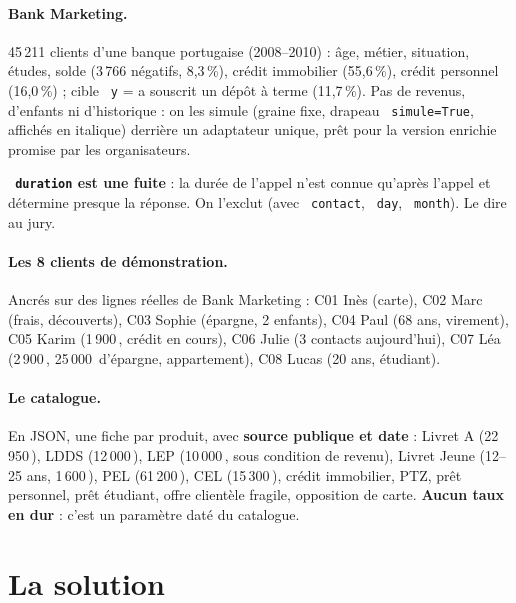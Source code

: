 \documentclass[11pt,a4paper]{article}
\DeclareRobustCommand{\f}[1]{{\texttt{\small
  \renewcommand{\_}{\char`\_\allowbreak}#1}}}
\newcommand{\eur}{\,\texteuro}
\begin{document}
\paragraph{Bank Marketing.} 45\,211 clients d'une banque portugaise (2008--2010) : âge, métier,
situation, études, solde (3\,766 négatifs, 8,3\,\%), crédit immobilier (55,6\,\%), crédit personnel
(16,0\,\%) ; cible \f{y} = a souscrit un dépôt à terme (11,7\,\%). Pas de revenus, d'enfants ni
d'historique : on les simule (graine fixe, drapeau \f{simule=True}, affichés en italique) derrière un
adaptateur unique, prêt pour la version enrichie promise par les organisateurs.

\begin{attention}
\textbf{\f{duration} est une fuite} : la durée de l'appel n'est connue qu'après l'appel et
détermine presque la réponse. On l'exclut (avec \f{contact}, \f{day}, \f{month}). Le dire au jury.
\end{attention}

\paragraph{Les 8 clients de démonstration.} Ancrés sur des lignes réelles de Bank Marketing :
C01 Inès (carte), C02 Marc (frais, découverts), C03 Sophie (épargne, 2 enfants), C04 Paul (68 ans,
virement), C05 Karim (1\,900\eur{}, crédit en cours), C06 Julie (3 contacts aujourd'hui),
C07 Léa (2\,900\eur{}, 25\,000\eur{} d'épargne, appartement), C08 Lucas (20 ans, étudiant).

\paragraph{Le catalogue.} En JSON, une fiche par produit, avec \textbf{source publique et date} :
Livret A (22\,950\eur{}), LDDS (12\,000\eur{}), LEP (10\,000\eur{}, sous condition de revenu),
Livret Jeune (12--25 ans, 1\,600\eur{}), PEL (61\,200\eur{}), CEL (15\,300\eur{}), crédit
immobilier, PTZ, prêt personnel, prêt étudiant, offre clientèle fragile, opposition de carte.
\textbf{Aucun taux en dur} : c'est un paramètre daté du catalogue.

\section{La solution}
\end{document}

